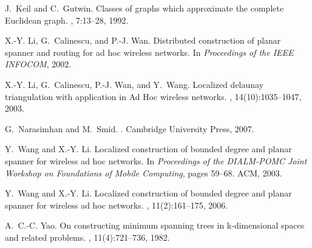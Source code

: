 \documentclass{stacs_proc}
\theoremstyle{plain}\newtheorem{satz}[thm]{Satz}
\begin{document}
\begin{thebibliography}{10}
J.~Keil and C.~Gutwin.
\newblock Classes of graphs which approximate the complete {Euclidean} graph.
, 7:13--28, 1992.

X.-Y. Li, G.~Calinescu, and P.-J. Wan.
\newblock Distributed construction of planar spanner and routing for ad hoc
  wireless networks.
\newblock In {\em Proceedings of the {IEEE} INFOCOM}, 2002.

X.-Y. Li, G.~Calinescu, P.-J. Wan, and Y.~Wang.
\newblock Localized delaunay triangulation with application in {Ad Hoc}
  wireless networks.
,
  14(10):1035--1047, 2003.

G.~Narasimhan and M.~Smid.
.
\newblock Cambridge University Press, 2007.

Y.~Wang and X.-Y. Li.
\newblock Localized construction of bounded degree and planar spanner for
  wireless ad hoc networks.
\newblock In {\em Proceedings of the {DIALM-POMC} Joint Workshop on Foundations
  of Mobile Computing}, pages 59--68. ACM, 2003.

Y.~Wang and X.-Y. Li.
\newblock Localized construction of bounded degree and planar spanner for
  wireless ad hoc networks.
, 11(2):161--175, 2006.

A.~C.-C. Yao.
\newblock On constructing minimum spanning trees in k-dimensional spaces and
  related problems.
, 11(4):721--736, 1982.

\end{thebibliography}
\end{document}
